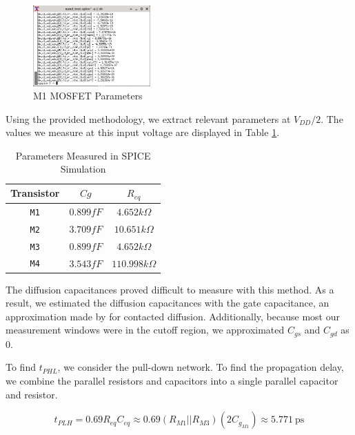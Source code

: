 \documentclass[fleqn]{article}
\begin{document}
	\begin{figure}[H]
		\centerline{\includegraphics[width=0.4\textwidth]{nand_eq_params_sweep_va_vb.png}}
		\caption{M1 MOSFET Parameters}			\label{fig::nor_eq_params_sweep_va_vb}
	\end{figure}
	
	Using the provided methodology, we extract relevant parameters at $V_{DD}/2$. The values we measure at this input voltage are displayed in Table \ref{table::nor_gate_eq_params}.
	
	\begin{table}[H]
	\begin{center}
	\caption{Parameters Measured in SPICE Simulation}
	\label{table::nor_gate_eq_params}
	\begin{tabular}{| c | c | c |}
		\hline
		Transistor & $Cg$ & $R_{eq}$ \\
		\hline	
		\texttt{M1} & $0.899fF$ & $4.652k\Omega$ \\
		\hline
		\texttt{M2} & $3.709fF$ & $10.651k\Omega$ \\
		\hline
		\texttt{M3} & $0.899fF$ & $4.652k\Omega$ \\
		\hline
		\texttt{M4} & $3.543fF$ & $110.998k\Omega$ \\
		\hline
	\end{tabular}	
	\end{center}
	\end{table}
	
	\noindent The diffusion capacitances proved difficult to measure with this method. As a result, we estimated the diffusion capacitances with the gate capacitance, an approximation made by \cite{cmos_vlsi_design} for contacted diffusion. Additionally, because most our measurement windows were in the cutoff region, we approximated $C_{gs}$ and $C_{gd}$ as 0. 
	
	To find $t_{PHL}$, we consider the pull-down network. To find the propagation delay, we combine the parallel resistors and capacitors into a single parallel capacitor and resistor.
	
	\begin{equation}
		t_{PLH} = 0.69R_{eq}C_{eq} \approx 0.69(R_{M1}||R_{M3})(2C_{g_{M1}}) \approx 5.771\ \text{ps}
	\end{equation}
	
\end{document}
